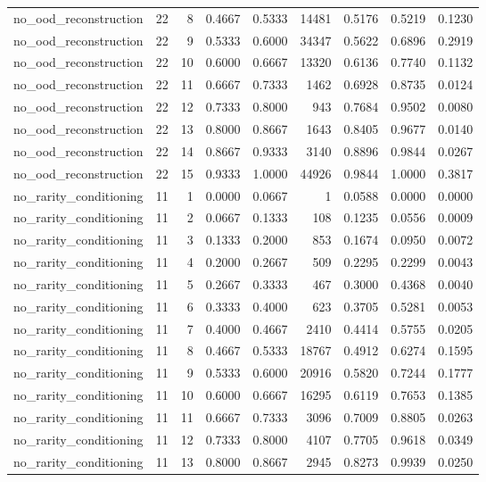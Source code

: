 \begin{tabular}{lrrrrrrrr}
no\_ood\_reconstruction & 22 & 8 & 0.4667 & 0.5333 & 14481 & 0.5176 & 0.5219 & 0.1230 \\
no\_ood\_reconstruction & 22 & 9 & 0.5333 & 0.6000 & 34347 & 0.5622 & 0.6896 & 0.2919 \\
no\_ood\_reconstruction & 22 & 10 & 0.6000 & 0.6667 & 13320 & 0.6136 & 0.7740 & 0.1132 \\
no\_ood\_reconstruction & 22 & 11 & 0.6667 & 0.7333 & 1462 & 0.6928 & 0.8735 & 0.0124 \\
no\_ood\_reconstruction & 22 & 12 & 0.7333 & 0.8000 & 943 & 0.7684 & 0.9502 & 0.0080 \\
no\_ood\_reconstruction & 22 & 13 & 0.8000 & 0.8667 & 1643 & 0.8405 & 0.9677 & 0.0140 \\
no\_ood\_reconstruction & 22 & 14 & 0.8667 & 0.9333 & 3140 & 0.8896 & 0.9844 & 0.0267 \\
no\_ood\_reconstruction & 22 & 15 & 0.9333 & 1.0000 & 44926 & 0.9844 & 1.0000 & 0.3817 \\
no\_rarity\_conditioning & 11 & 1 & 0.0000 & 0.0667 & 1 & 0.0588 & 0.0000 & 0.0000 \\
no\_rarity\_conditioning & 11 & 2 & 0.0667 & 0.1333 & 108 & 0.1235 & 0.0556 & 0.0009 \\
no\_rarity\_conditioning & 11 & 3 & 0.1333 & 0.2000 & 853 & 0.1674 & 0.0950 & 0.0072 \\
no\_rarity\_conditioning & 11 & 4 & 0.2000 & 0.2667 & 509 & 0.2295 & 0.2299 & 0.0043 \\
no\_rarity\_conditioning & 11 & 5 & 0.2667 & 0.3333 & 467 & 0.3000 & 0.4368 & 0.0040 \\
no\_rarity\_conditioning & 11 & 6 & 0.3333 & 0.4000 & 623 & 0.3705 & 0.5281 & 0.0053 \\
no\_rarity\_conditioning & 11 & 7 & 0.4000 & 0.4667 & 2410 & 0.4414 & 0.5755 & 0.0205 \\
no\_rarity\_conditioning & 11 & 8 & 0.4667 & 0.5333 & 18767 & 0.4912 & 0.6274 & 0.1595 \\
no\_rarity\_conditioning & 11 & 9 & 0.5333 & 0.6000 & 20916 & 0.5820 & 0.7244 & 0.1777 \\
no\_rarity\_conditioning & 11 & 10 & 0.6000 & 0.6667 & 16295 & 0.6119 & 0.7653 & 0.1385 \\
no\_rarity\_conditioning & 11 & 11 & 0.6667 & 0.7333 & 3096 & 0.7009 & 0.8805 & 0.0263 \\
no\_rarity\_conditioning & 11 & 12 & 0.7333 & 0.8000 & 4107 & 0.7705 & 0.9618 & 0.0349 \\
no\_rarity\_conditioning & 11 & 13 & 0.8000 & 0.8667 & 2945 & 0.8273 & 0.9939 & 0.0250 \\

\end{tabular}

